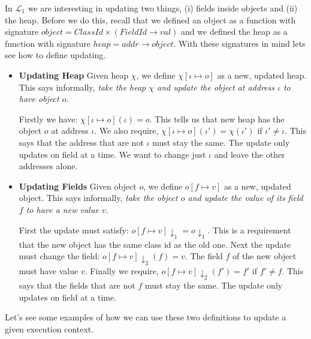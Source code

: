 In $\mathcal{L}_1$ we are interesting in updating two things, (i) fields inside objects and 
(ii) the heap. Before we do this, recall that we defined an object as a 
function with signature $object = ClassId \times (FieldId \rightarrow val)$ 
and we defined the heap as a function with signature
$heap = addr \rightarrow object$. With these signatures in mind lets see 
how to define updating.

\begin{itemize}   
\renewcommand{\labelitemi}{$\Box$}
\item \textbf{Updating Heap}
Given heap $\chi$, we define $\chi[\iota \mapsto o]$ as a new, updated heap.
This says informally, \textit{take the heap $\chi$ and update the 
object at address $\iota$ to have object $o$}.

Firstly we have: $\chi[\iota \mapsto o](\iota) = o$. 
This tells us that new heap has the object $o$ at address $\iota$.
We also require, $\chi[\iota \mapsto o](\iota') = \chi(\iota')$ if $\iota' \neq \iota$. 
This says that the address that are not $\iota$ must stay the same.
The update only updates on field at a time. We want to change just $\iota$ and leave 
the other addresses alone.
\item \textbf{Updating Fields} 
Given object $o$, we define $o[f \mapsto v]$ as a new, updated object.
This says informally, \textit{take the object $o$ and update the 
value of its field $f$ to have a new value $v$}.

First the update must satisfy: $o[f \mapsto v] \downarrow_1 = o \downarrow_1$. 
This is a requirement that the new object has the same class id as the old one.
Next the update must change the field: $o[f \mapsto v] \downarrow_2 (f) = v$.
The field $f$ of the new object must have value $v$. 
Finally we require, $o[f \mapsto v] \downarrow_2 (f') = f'$ if $f' \neq f$. 
This says that the fields that are not $f$ must stay the same.
The update only updates on field at a time.
\end{itemize}



Let's see some examples of how we can use these two definitions 
to update a given execution context.

\frmrule



